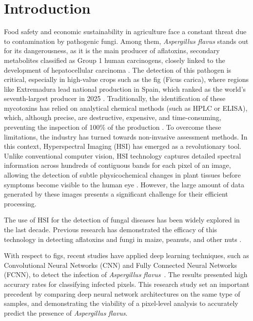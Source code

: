 \documentclass[runningheads]{llncs}
\begin{document}
\section{Introduction}
Food safety and economic sustainability in agriculture face a constant threat due to contamination by pathogenic fungi. 
Among them, \textit{Aspergillus flavus} stands out for its dangerousness, as it is the main producer of aflatoxins, secondary metabolites classified as Group 1 human carcinogens, closely linked to the development of hepatocellular carcinoma \cite{cruz-carrasco_detection_2024}. 
The detection of this pathogen is critical, especially in high-value crops such as the fig (Ficus carica), where regions like Extremadura lead national production in Spain, which ranked as the world's seventh-largest producer in 2025 \cite{fao_fao_2025}. 
Traditionally, the identification of these mycotoxins has relied on analytical chemical methods (such as HPLC or ELISA), which, although precise, are destructive, expensive, and time-consuming, preventing the inspection of 100\% of the production \cite{chu_classifying_2020, park_hyperspectral_2015}. 
To overcome these limitations, the industry has turned towards non-invasive assessment methods. 
In this context, Hyperspectral Imaging (HSI) has emerged as a revolutionary tool. 
Unlike conventional computer vision, HSI technology captures detailed spectral information across hundreds of contiguous bands for each pixel of an image, allowing the detection of subtle physicochemical changes in plant tissues before symptoms become visible to the human eye \cite{wang_review_2021, chu_classifying_2020}. 
However, the large amount of data generated by these images presents a significant challenge for their efficient processing.

The use of HSI for the detection of fungal diseases has been widely explored in the last decade. 
Previous research has demonstrated the efficacy of this technology in detecting aflatoxins and fungi in maize, peanuts, and other nuts \cite{park_hyperspectral_2015, cruz-carrasco_detection_2024}. 

With respect to figs, recent studies have applied deep learning techniques, such as Convolutional Neural Networks (CNN) and Fully Connected Neural Networks (FCNN), to detect the infection of \textit{Aspergillus flavus}~\cite{cruz-carrasco_detection_2024}. The results presented high accurary rates for classifying infected pixels. This research study set an important precedent by comparing deep neural network architectures on the same type of samples, and demonstrating the viability of a pixel-level analysis to accurately predict the presence of \textit{Aspergillus flavus}.
\end{document}
